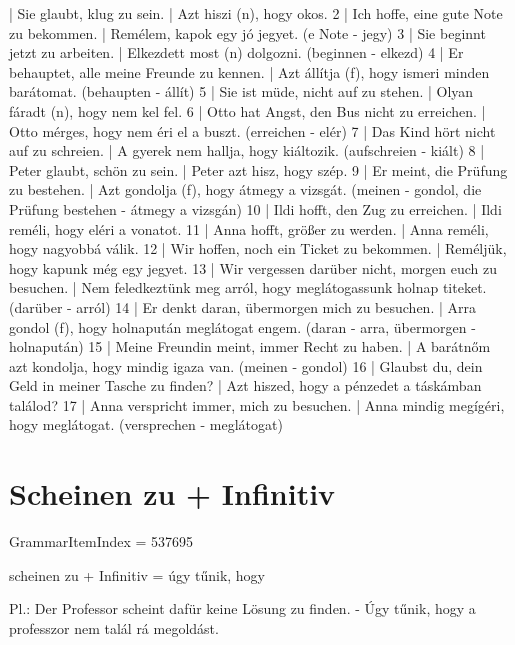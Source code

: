\documentclass{article}
\newenvironment{desc}{\verbatim}{\endverbatim}
\newenvironment{exmp}{\verbatim}{\endverbatim}
\begin{document}
\begin{exmp}
1 | Sie glaubt, klug zu sein. | Azt hiszi (n), hogy okos.
2 | Ich hoffe, eine gute Note zu bekommen. | Remélem, kapok egy jó jegyet. (e Note - jegy)
3 | Sie beginnt jetzt zu arbeiten. | Elkezdett most (n) dolgozni. (beginnen - elkezd)
4 | Er behauptet, alle meine Freunde zu kennen. | Azt állítja (f), hogy ismeri minden barátomat. (behaupten - állít)
5 | Sie ist müde, nicht auf zu stehen. | Olyan fáradt (n), hogy nem kel fel.
6 | Otto hat Angst, den Bus nicht zu erreichen. | Otto mérges, hogy nem éri el a buszt. (erreichen - elér)
7 | Das Kind hört nicht auf zu schreien. | A gyerek nem hallja, hogy kiáltozik. (aufschreien - kiált)
8 | Peter glaubt, schön zu sein. | Peter azt hisz, hogy szép.
9 | Er meint, die Prüfung zu bestehen. | Azt gondolja (f), hogy átmegy a vizsgát. (meinen - gondol, die Prüfung bestehen - átmegy a vizsgán)
10 | Ildi hofft, den Zug zu erreichen. | Ildi reméli, hogy eléri a vonatot.
11 | Anna hofft, größer zu werden. | Anna reméli, hogy nagyobbá válik.
12 | Wir hoffen, noch ein Ticket zu bekommen. | Reméljük, hogy kapunk még egy jegyet.
13 | Wir vergessen darüber nicht, morgen euch zu besuchen. | Nem feledkeztünk meg arról, hogy meglátogassunk holnap titeket. (darüber - arról)
14 | Er denkt daran, übermorgen mich zu besuchen. | Arra gondol (f), hogy holnapután meglátogat engem. (daran - arra, übermorgen - holnapután)
15 | Meine Freundin meint, immer Recht zu haben. | A barátnőm azt kondolja, hogy mindig igaza van. (meinen - gondol)
16 | Glaubst du, dein Geld in meiner Tasche zu finden? | Azt hiszed, hogy a pénzedet a táskámban találod?
17 | Anna verspricht immer, mich zu besuchen. | Anna mindig megígéri, hogy meglátogat. (versprechen - meglátogat)
\end{exmp}

\section{Scheinen zu + Infinitiv}

GrammarItemIndex = 537695

\begin{desc}
scheinen zu + Infinitiv = úgy tűnik, hogy

Pl.: Der Professor scheint dafür keine Lösung zu finden. - Úgy tűnik, hogy a professzor nem talál rá megoldást.
\end{desc}
\end{document}
